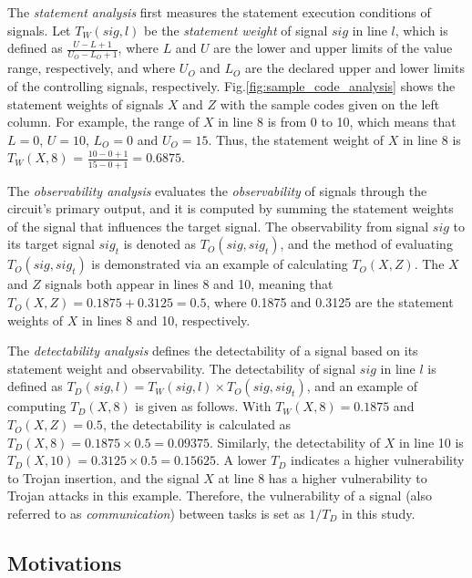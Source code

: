 \documentclass[10pt,journal, compsoc]{IEEEtran}
\begin{document}

The \textit{statement analysis} first measures the statement execution conditions of signals. Let $T_W(sig, l)$ be the \textit{statement weight} of signal $sig$ in line $l$, which is defined as $\frac{U-L+1}{U_O-L_O+1}$, where $L$ and $U$ are the lower and upper limits of the value range, respectively, and where $U_O$ and $L_O$ are the declared upper and lower limits of the controlling signals, respectively. Fig.\ref{fig:sample_code_analysis} shows the statement weights of signals $X$ and $Z$ with the sample codes given on the left column. For example, the range of $X$ in line 8 is from 0 to 10, which means that $L = 0$, $U = 10$, $L_O = 0$ and $U_O = 15$. Thus, the statement weight of $X$ in line 8  is $T_W(X,8)$ = $\frac{10-0+1}{15-0+1} = 0.6875$.

The \textit{observability analysis} evaluates the \textit{observability} of signals through the circuit's primary output, and it is computed by summing the statement weights of the signal that influences the target signal. The observability from signal $sig$ to its target signal $sig_t$ is denoted as $T_O(sig, sig_t)$, and the method of evaluating $T_O(sig, sig_t)$ is demonstrated via an example of calculating $T_O(X, Z)$. The $X$ and $Z$ signals both appear in lines 8 and 10, meaning that $T_O(X, Z)=0.1875 + 0.3125 = 0.5$, where 0.1875 and 0.3125 are the statement weights of $X$ in lines 8 and 10, respectively.

The \textit{detectability analysis} defines the detectability of a signal based on its statement weight and observability. The detectability of signal $sig$ in line $l$ is defined as $T_D(sig,l) = T_W(sig,l) \times T_O(sig,sig_t)$, and an example of computing $T_D(X,8)$ is given as follows. With $T_W(X,8)=0.1875$ and $T_O(X,Z)=0.5$, the detectability is calculated as $T_D(X,8) = 0.1875 \times 0.5 = 0.09375$. Similarly, the detectability of $X$ in line 10 is $T_D(X,10) = 0.3125 \times 0.5 = 0.15625$. A lower $T_D$ indicates a higher vulnerability to Trojan insertion, and the signal $X$ at line 8 has a higher vulnerability to Trojan attacks in this example. Therefore, the vulnerability of a signal (also referred to as \textit{communication})  between tasks is set as $1/T_D$ in this study.


\subsection{Motivations}
\end{document}

